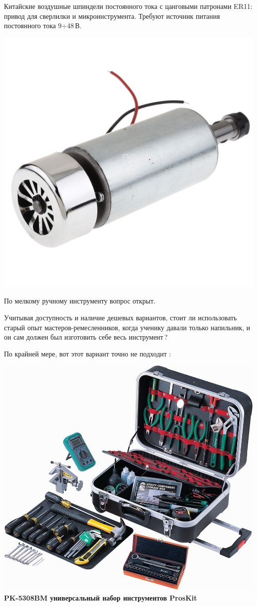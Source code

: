 \documentclass{magazine}
\begin{document}
{\bigskip
Китайские воздушные шпиндели постоянного тока с цанговыми патронами ER11:
привод для сверлилки и микроинструмента. Требуют источник питания
постоянного тока 9$\div$48\,В.

\noindent\includegraphics[width=\columnwidth]{fig/00/ER11.jpg}


По мелкому ручному инструменту вопрос открыт.

Учитывая доступность и наличие дешевых вариантов, стоит ли использовать старый
опыт мастеров-ремесленников, когда ученику давали только напильник, и он сам
должен был изготовить себе весь инструмент\,?

По крайней мере, вот этот вариант точно не подходит \smiley:

\noindent\includegraphics[width=\columnwidth]{fig/00/PK5308BM.jpg}
\textbf{PK-5308BM универсальный набор инструментов ProsKit}

}
\end{document}
